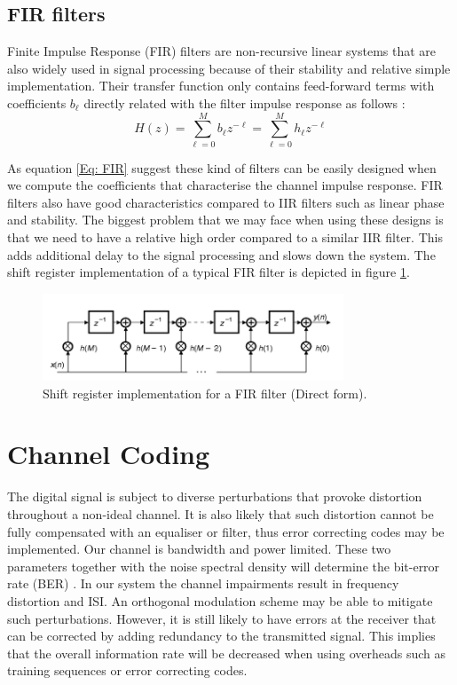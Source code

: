 \documentclass[12pt,a4paper,openright]{report}
\begin{document}
\subsection{FIR filters}
Finite Impulse Response (FIR) filters are non-recursive linear systems that are also widely used in signal processing because of their stability and relative simple implementation. Their transfer function only contains feed-forward terms with coefficients $b_\ell$ directly related with the filter impulse response as follows \cite{DSPDiniz}: 
\begin{equation}\label{Eq: FIR}
H\left( z \right) = \sum\limits_{\ell  = 0}^M {{b_\ell }{z^{ - \ell }}}=\sum\limits_{\ell  = 0}^M {{h_\ell }{z^{ - \ell }}}
\end{equation}

As equation \ref{Eq: FIR} suggest these kind of filters can be easily designed when we compute the coefficients that characterise the channel impulse response. FIR filters also have good characteristics compared to IIR filters such as linear phase and stability. The biggest problem that we may face when using these designs is that we need to have a relative high order compared to a similar IIR filter. This adds additional delay to the signal processing and slows down the system. The shift register implementation of a typical FIR filter is depicted in figure \ref{fig:FIRfilter}.
 
  \begin{figure}[H]
   \centering
     \includegraphics[width=0.8\textwidth]{FIRfilter.png}
     \caption[Shift register implementation for a FIR filter]{Shift register implementation for a FIR filter (Direct form)\cite{DSPDiniz}.}
     \label{fig:FIRfilter}
 \end{figure}  

\section{Channel Coding}
\label{sec:channcod}
The digital signal is subject to diverse perturbations that provoke distortion throughout a non-ideal channel. It is also likely that such distortion  cannot be fully compensated with an equaliser or filter, thus error correcting codes may be implemented. Our channel is bandwidth and power limited. These two parameters together with the noise spectral density will determine the bit-error rate (BER) \cite{HaykinBook}. In our system the channel impairments result in frequency distortion and ISI. An orthogonal  modulation scheme may be able to mitigate such perturbations. However, it is still likely to have errors at the receiver that can be corrected by adding redundancy to the transmitted signal. This implies that the overall information rate will be decreased when using overheads such as training sequences or error correcting codes.
 
\end{document}
